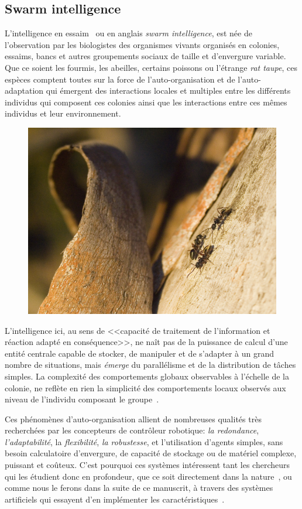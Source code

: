 \documentclass[a4paper,10pt]{report}
\begin{document}
\subsection{Swarm intelligence }
\label{sec:swarm}



L'intelligence en essaim~\citep{garnier07biolprinswarinte} ou en anglais \emph{swarm intelligence}, est née de l'observation par les biologistes des organismes vivants organisés en colonies, essaims, bancs et autres groupements sociaux de taille et d'envergure variable. 
Que ce soient les fourmis, les abeilles, certains poissons ou l'étrange \emph{rat taupe}, ces espèces comptent toutes sur la force de l'auto-organisation et de l'auto-adaptation qui émergent des interactions locales et multiples entre les différents individus qui composent ces colonies ainsi que les interactions entre ces mêmes individus et leur environnement.

\begin{figure}[H]
\centering
\includegraphics[width=.5\textwidth]{images/381340_9806}
\end{figure}



L'intelligence ici, au sens de <<capacité de traitement de l'information et réaction adapté en conséquence>>, ne naît pas de la puissance de calcul d'une entité centrale capable de stocker, de manipuler et de s'adapter à un grand nombre de situations, mais \emph{émerge} du parallélisme et de la distribution de tâches simples. La complexité des comportements globaux observables à l'échelle de la colonie, ne reflète en rien la simplicité des comportements locaux observés aux niveau de l'individu composant le groupe~\citep{detrain2002complexity}. 

Ces phénomènes d'auto-organisation allient de nombreuses qualités très recherchées par les concepteurs de contrôleur robotique:  \emph{la redondance}, \emph{l'adaptabilité}, la \emph{flexibilité}, \emph{la robustesse}, et l'utilisation d'agents simples, sans besoin calculatoire d'envergure, de capacité de stockage ou de matériel complexe, puissant et coûteux. C'est pourquoi ces systèmes intéressent tant les chercheurs qui les étudient donc en profondeur, que ce soit directement dans la nature~\citep{garnier07biolprinswarinte}, ou comme nous le ferons dans la suite de ce manuscrit, à travers des systèmes artificiels qui essayent d'en implémenter les caractéristiques~\citep{bonabeau99swarmintelligence,bonabeau97adaptivetaskallocationinspiredbymodeldivisionlaborsocialinsects,sumpter10collanimbeha}.
\end{document}
